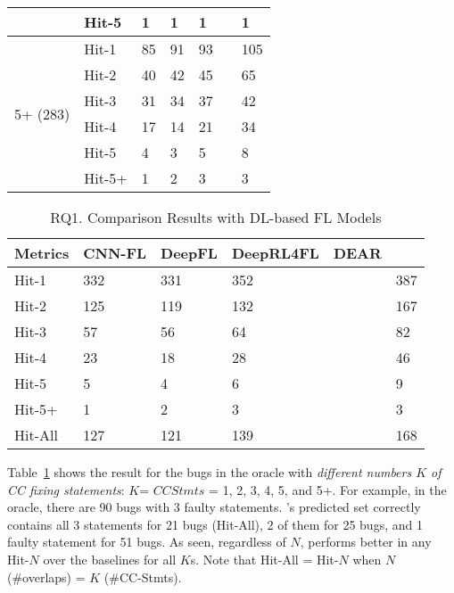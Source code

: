 \begin{table}[t]
{\begin{center}
\begin{tabular}{p{1.3cm}<{\centering}|p{0.8cm}<{\centering}|p{1cm}<{\centering}|p{0.8cm}<{\centering}|p{1.3cm}<{\centering}|p{1cm}<{\centering}|p{1.3cm}<{\centering}}
				& Hit-5     & 1 & 1 & 1 & & 1 \\
				\hline
				\multirow{6}{*}{5+ (283)}  & Hit-1 & 85 & 91 & 93 & & 105 \\
				& Hit-2     & 40 & 42 & 45 & & 65 \\
				& Hit-3     & 31 & 34 & 37 & & 42 \\
				& Hit-4     & 17 & 14 & 21 & & 34 \\
				& Hit-5     & 4 & 3 & 5 & & 8 \\
				& Hit-5+    & 1 & 2 & 3 & & 3 \\
				\hline
			\end{tabular}
			
			\label{fig:rq1-details}
		\end{center}
	}
\end{table}

\begin{table}[t]
	\caption{RQ1. Comparison Results with DL-based FL Models}
	\vspace{-10pt}
	{\small
		\begin{center}
			\renewcommand{\arraystretch}{1}
			\begin{tabular}{p{1.2cm}<{\centering}|p{1cm}<{\centering}|p{0.8cm}<{\centering}|p{1.2cm}<{\centering}|p{1cm}<{\centering}|p{1.2cm}<{\centering}}
				\hline
				Metrics & CNN-FL & DeepFL & DeepRL4FL & DEAR & \tool \\			
				\hline
				Hit-1   & 332 & 331 & 352 & & 387 \\
				Hit-2	& 125 & 119 & 132 & & 167 \\
				Hit-3	& 57 & 56 & 64 & & 82 \\
				Hit-4	& 23 & 18 & 28 & & 46 \\
				Hit-5	& 5 & 4 & 6 & & 9 \\
				Hit-5+	& 1 & 2 & 3 & & 3 \\
                                Hit-All & 127  & 121  & 139  & & 168\\
				\hline
			\end{tabular}
			
			\label{fig:rq1-overview}
		\end{center}
	}
\end{table}

Table~\ref{fig:rq1-details} shows the result for the bugs in the
oracle with {\em different numbers $K$ of CC fixing statements}: $K$=
$CCStmts$ = 1, 2, 3, 4, 5, and 5+. For example, in the oracle, there
are 90 bugs with 3 faulty statements. {\tool}'s predicted set
correctly contains all 3 statements for 21 bugs (Hit-All), 2 of them
for 25 bugs, and 1 faulty statement for 51 bugs. As seen, regardless
of $N$, {\tool} performs better in any Hit-$N$ over the baselines for
all $K$s. Note that Hit-All = Hit-$N$ when $N$ (\#overlaps) = $K$ (\#CC-Stmts).


